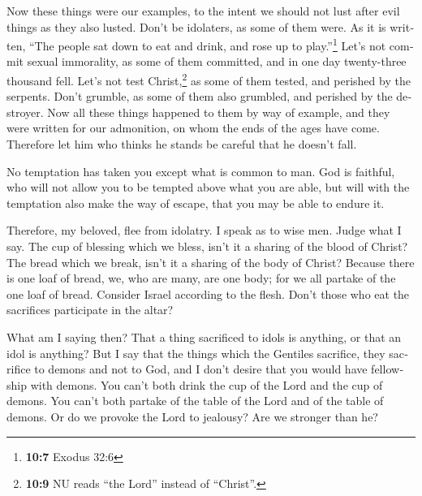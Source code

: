 \begin{paracol}{2}
\begin{otherlanguage}{english}
 Now these things were our examples, to the intent we
should not lust after evil things as they also lusted. 
Don't be idolaters, as some of them were. As it is written, ``The people
sat down to eat and drink, and rose up to play.''\footnote{\textbf{10:7}
  Exodus 32:6}  Let's not commit sexual immorality, as
some of them committed, and in one day twenty-three thousand fell.
 Let's not test Christ,\footnote{\textbf{10:9} NU reads
  ``the Lord'' instead of ``Christ''.} as some of them tested, and
perished by the serpents.  Don't grumble, as some of them
also grumbled, and perished by the destroyer.  Now all
these things happened to them by way of example, and they were written
for our admonition, on whom the ends of the ages have come.
 Therefore let him who thinks he stands be careful that
he doesn't fall.

 No temptation has taken you except what is common to
man. God is faithful, who will not allow you to be tempted above what
you are able, but will with the temptation also make the way of escape,
that you may be able to endure it.

 Therefore, my beloved, flee from idolatry.
 I speak as to wise men. Judge what I say.
 The cup of blessing which we bless, isn't it a sharing
of the blood of Christ? The bread which we break, isn't it a sharing of
the body of Christ?  Because there is one loaf of bread,
we, who are many, are one body; for we all partake of the one loaf of
bread.  Consider Israel according to the flesh. Don't
those who eat the sacrifices participate in the altar?

 What am I saying then? That a thing sacrificed to idols
is anything, or that an idol is anything?  But I say that
the things which the Gentiles sacrifice, they sacrifice to demons and
not to God, and I don't desire that you would have fellowship with
demons.  You can't both drink the cup of the Lord and the
cup of demons. You can't both partake of the table of the Lord and of
the table of demons.  Or do we provoke the Lord to
jealousy? Are we stronger than he?


\end{otherlanguage}
\end{paracol}
